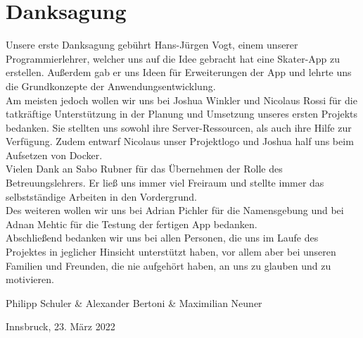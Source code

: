 \section*{Danksagung}
Unsere erste Danksagung gebührt Hans-Jürgen Vogt, einem unserer Programmierlehrer, welcher uns auf
die Idee gebracht hat eine Skater-App zu erstellen. Außerdem gab er uns Ideen für Erweiterungen der
App und lehrte uns die Grundkonzepte der Anwendungsentwicklung. \\

Am meisten jedoch wollen wir uns bei Joshua Winkler und Nicolaus Rossi für die tatkräftige
Unterstützung in der Planung und Umsetzung unseres ersten Projekts bedanken. Sie stellten uns sowohl
ihre Server-Ressourcen, als auch ihre Hilfe zur Verfügung. Zudem entwarf Nicolaus unser Projektlogo
und Joshua half uns beim Aufsetzen von Docker. \\

Vielen Dank an Sabo Rubner für das Übernehmen der Rolle des Betreuungslehrers. Er ließ uns immer
viel Freiraum und stellte immer das selbstständige Arbeiten in den Vordergrund. \\

Des weiteren wollen wir uns bei Adrian Pichler für die Namensgebung und bei Adnan Mehtic für die
Testung der fertigen App bedanken. \\

Abschließend bedanken wir uns bei allen Personen, die uns im Laufe des Projektes in jeglicher
Hinsicht unterstützt haben, vor allem aber bei unseren Familien und Freunden, die nie aufgehört
haben, an uns zu glauben und zu motivieren. \\

\vspace{2cm}

Philipp Schuler \& Alexander Bertoni \& Maximilian Neuner

Innsbruck, 23. März 2022

\newpage